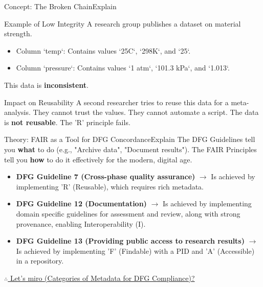 \begin{frame}{Concept: The Broken Chain}{Explain}
    \begin{block}{Example of Low Integrity}
        A research group publishes a dataset on material strength.
        \begin{itemize}
            \item Column `temp`: Contains values `25C`, `298K`, and `25`.
            \item Column `pressure`: Contains values `1 atm`, `101.3 kPa`, and `1.013`.
        \end{itemize}
        This data is \textbf{inconsistent}.
    \end{block}
    \pause
    \begin{block}{Impact on Reusability}
        A second researcher tries to reuse this data for a meta-analysis. They cannot trust the values. They cannot automate a script. The data is \textbf{not reusable}. The 'R' principle fails.
    \end{block}
\end{frame}

\begin{frame}{Theory: FAIR as a Tool for DFG Concordance}{Explain}
    The DFG Guidelines tell you \textbf{what} to do (e.g., "Archive data", "Document results").
    \pause
    The FAIR Principles tell you \textbf{how} to do it effectively for the modern, digital age.
    
    \begin{itemize}
        \item \textbf{DFG Guideline 7 (Cross-phase quality assurance)} $\rightarrow$ Is achieved by implementing 'R' (Reusable), which requires rich metadata.
        \pause
        \item \textbf{DFG Guideline 12 (Documentation)} $\rightarrow$ Is achieved by implementing domain specific guidelines for assessment and review, along with strong provenance, enabling Interoperability (I).
        \pause
        \item \textbf{DFG Guideline 13 (Providing public access to research results)} $\rightarrow$ Is achieved by implementing 'F' (Findable) with a PID and 'A' (Accessible) in a repository.
    \end{itemize}
    \href{https://miro.com/app/board/uXjVJpI_9Kc=/?moveToWidget=3458764648818228865&cot=14}{$\therefore$ Let's miro (Categories of Metadata for DFG Compliance)?}    
\end{frame}

